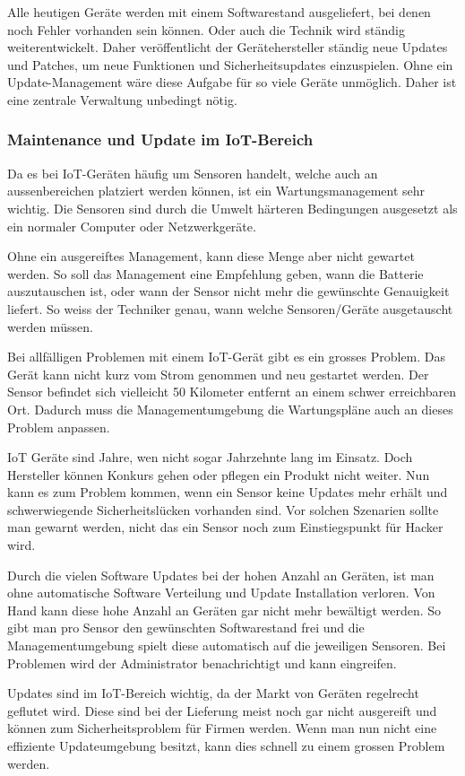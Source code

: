Alle heutigen Geräte werden mit einem Softwarestand ausgeliefert, bei denen noch Fehler vorhanden sein können. Oder auch die Technik wird ständig weiterentwickelt. Daher veröffentlicht der Gerätehersteller ständig neue Updates und Patches, um neue Funktionen und Sicherheitsupdates einzuspielen. Ohne ein Update-Management wäre diese Aufgabe für so viele Geräte unmöglich. Daher ist eine zentrale Verwaltung unbedingt nötig. 
\subsubsection{Maintenance und Update im IoT-Bereich}
Da es bei IoT-Geräten häufig um Sensoren handelt, welche auch an aussenbereichen platziert werden können, ist ein Wartungsmanagement sehr wichtig. Die Sensoren sind durch die Umwelt härteren Bedingungen ausgesetzt als ein normaler Computer oder Netzwerkgeräte.

Ohne ein ausgereiftes Management, kann diese Menge aber nicht gewartet werden. So soll das Management eine Empfehlung geben, wann die Batterie auszutauschen ist, oder wann der Sensor nicht mehr die gewünschte Genauigkeit liefert. So weiss der Techniker genau, wann welche Sensoren/Geräte ausgetauscht werden müssen.

Bei allfälligen Problemen mit einem IoT-Gerät gibt es ein grosses Problem. Das Gerät kann nicht kurz vom Strom genommen und neu gestartet werden. Der Sensor befindet sich vielleicht 50 Kilometer entfernt an einem schwer erreichbaren Ort. Dadurch muss die Managementumgebung die Wartungspläne auch an dieses Problem anpassen. 

IoT Geräte sind Jahre, wen nicht sogar Jahrzehnte lang im Einsatz. Doch Hersteller können Konkurs gehen oder pflegen ein Produkt nicht weiter. Nun kann es zum Problem kommen, wenn ein Sensor keine Updates mehr erhält und schwerwiegende Sicherheitslücken vorhanden sind. Vor solchen Szenarien sollte man gewarnt werden, nicht das ein Sensor noch zum Einstiegspunkt für Hacker wird.

Durch die vielen Software Updates bei der hohen Anzahl an Geräten, ist man ohne automatische Software Verteilung und Update Installation verloren. Von Hand kann diese hohe Anzahl an Geräten gar nicht mehr bewältigt werden. So gibt man pro Sensor den gewünschten Softwarestand frei und die Managementumgebung spielt diese automatisch auf die jeweiligen Sensoren. Bei Problemen wird der Administrator benachrichtigt und kann eingreifen.

Updates sind im IoT-Bereich wichtig, da der Markt von Geräten regelrecht geflutet wird. Diese sind bei der Lieferung meist noch gar nicht ausgereift und können zum Sicherheitsproblem für Firmen werden. Wenn man nun nicht eine effiziente Updateumgebung besitzt, kann dies schnell zu einem grossen Problem werden.

